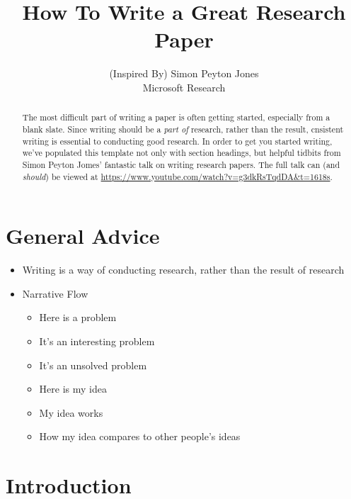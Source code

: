 \documentclass[11pt,a4paper]{article}
\title{How To Write a Great Research Paper}
\author{(Inspired By) Simon Peyton Jones \\
  Microsoft Research \\
  }
\date{}
\begin{document}
\maketitle
\begin{abstract}
 The most difficult part of writing a paper is often getting started, especially from a blank slate. Since writing should be a \textit{part of} research, rather than the result, cnsistent writing is essential to conducting good research. In order to get you started writing, we've populated this template not only with section headings, but helpful tidbits from Simon Peyton Jomes' fantastic talk on writing research papers. The full talk can (and \textit{should}) be viewed at \url{https://www.youtube.com/watch?v=g3dkRsTqdDA&t=1618s}.
\end{abstract}

\section{General Advice}
\begin{itemize}
\item Writing is a way of conducting research, rather than the result of research
\item Narrative Flow
    \begin{itemize}
    \item Here is a problem
    \item  It's an interesting problem
    \item It's an unsolved problem
    \item Here is my idea
    \item My idea works
    \item How my idea compares to other people's ideas
    \end{itemize}
\end{itemize}

\section{Introduction}
\end{document}

